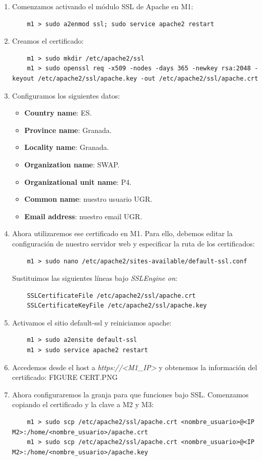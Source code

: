 \documentclass[12pt,spanish]{article}
\begin{document}
\begin{enumerate}
	\item Comenzamos activando el módulo SSL de Apache en M1:
	\begin{lstlisting}
	m1 > sudo a2enmod ssl; sudo service apache2 restart
	\end{lstlisting}
	\item Creamos el certificado:
	\begin{lstlisting}
	m1 > sudo mkdir /etc/apache2/ssl
	m1 > sudo openssl req -x509 -nodes -days 365 -newkey rsa:2048 -keyout /etc/apache2/ssl/apache.key -out /etc/apache2/ssl/apache.crt
	\end{lstlisting}
	\item Configuramos los siguientes datos:
		\begin{itemize}
			\item \textbf{Country name}: ES.
			\item \textbf{Province name}: Granada.
			\item \textbf{Locality name}: Granada.
			\item \textbf{Organization name}: SWAP.
			\item \textbf{Organizational unit name}: P4.
			\item \textbf{Common name}: nuestro usuario UGR.
			\item \textbf{Email address}: nuestro email UGR.
		\end{itemize}
	\item Ahora utilizaremos ese certificado en M1. Para ello, debemos editar la configuración de nuestro servidor web y especificar la ruta de los certificados:
	\begin{lstlisting}
	m1 > sudo nano /etc/apache2/sites-available/default-ssl.conf
	\end{lstlisting}
	Sustituimos las siguientes líneas bajo \emph{SSLEngine on}:
	\begin{lstlisting}
	SSLCertificateFile /etc/apache2/ssl/apache.crt
	SSLCertificateKeyFile /etc/apache2/ssl/apache.key
	\end{lstlisting}
	\item Activamos el sitio default-ssl y reiniciamos apache:
	\begin{lstlisting}
	m1 > sudo a2ensite default-ssl
	m1 > sudo service apache2 restart
	\end{lstlisting}
	\item Accedemos desde el host a \emph{https://<M1_IP>} y obtenemos la información del certificado:
	FIGURE CERT.PNG
	\item Ahora configuraremos la granja para que funciones bajo SSL. Comenzamos copiando el certificado y la clave a M2 y M3:
	\begin{lstlisting}
	m1 > sudo scp /etc/apache2/ssl/apache.crt <nombre_usuario>@<IP M2>:/home/<nombre_usuario>/apache.crt
	m1 > sudo scp /etc/apache2/ssl/apache.crt <nombre_usuario>@<IP M2>:/home/<nombre_usuario>/apache.key


\end{lstlisting}
\end{enumerate}
\end{document}
